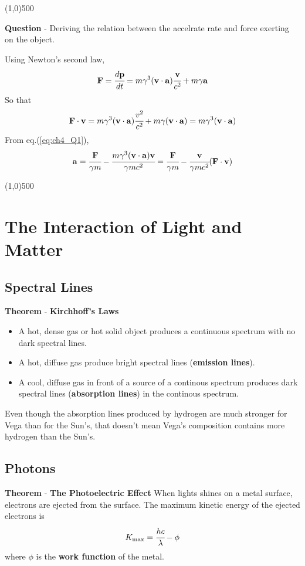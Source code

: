 \documentclass{article}
\numberwithin{equation}{section}
\numberwithin{figure}{section}
\newcommand{\hr}{\begin{center} \line(1,0){500} \end{center}}
\begin{document}
	\hr{\bf Question} - Deriving the relation between the accelrate rate and force exerting on the object.
	
	Using Newton's second law,
	\begin{equation}\label{eq:ch4_Q1}
		{\bf F} = \cfrac{d{\bf p}}{dt} = m\gamma^3({\bf v}\cdot{\bf a})\cfrac{\bf v}{c^2} + m\gamma{\bf a}
	\end{equation}
	So that
	\begin{equation}
		{\bf F}\cdot{\bf v} = m\gamma^3({\bf v}\cdot{\bf a})\cfrac{v^2}{c^2} + m\gamma({\bf v}\cdot{\bf a}) = m\gamma^3({\bf v}\cdot{\bf a})
	\end{equation}
	From eq.(\ref{eq:ch4_Q1}),
	\begin{equation}
		{\bf a} = \cfrac{{\bf F}}{\gamma m} - \cfrac{m\gamma^3({\bf v}\cdot{\bf a}){\bf v}}{\gamma mc^2} = \cfrac{{\bf F}}{\gamma m} - \cfrac{\bf v}{\gamma mc^2}({\bf F}\cdot{\bf v})
	\end{equation}
	\hr
	
\section{The Interaction of Light and Matter}
	\subsection{Spectral Lines}
	{\bf Theorem} - {\bf Kirchhoff's Laws}
	\begin{itemize}
		\item A hot, dense gas or hot solid object produces a continuous spectrum with no dark spectral lines.
		\item A hot, diffuse gas produce bright spectral lines ({\bf emission lines}).
		\item A cool, diffuse gas in front of a source of a continous spectrum produces dark spectral lines ({\bf absorption lines}) in the continous spectrum.
	\end{itemize}
	Even though the absorption lines produced by hydrogen are much stronger for Vega than for the Sun's, that doesn't mean Vega's composition contains more hydrogen than the Sun's.
	
	\subsection{Photons}
	{\bf Theorem} - {\bf The Photoelectric Effect}
	When lights shines on a metal surface, electrons are ejected from the surface. The maximum kinetic energy of the ejected electrons is
	\begin{equation}
		K_{\rm max} = \cfrac{hc}{\lambda} - \phi
	\end{equation}
	where $\phi$ is the {\bf work function} of the metal.
	
\end{document}
